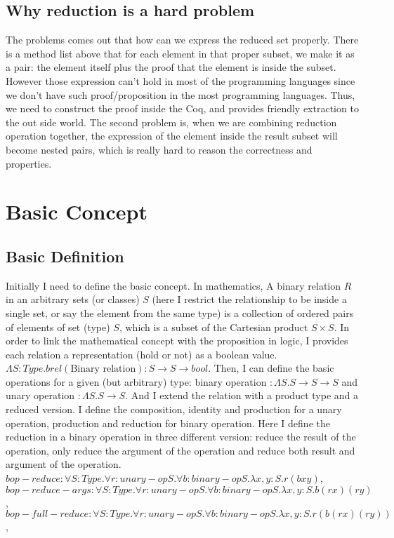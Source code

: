 \documentclass[11pt]{article}
\begin{document}
\subsection{Why reduction is a hard problem}
The problems comes out that how can we express the reduced set properly. There is a method list above that for each element in that proper subset, we make it as a pair: the element itself plus the proof that the element is inside the subset. However those expression can't hold in most of the programming languages since we don't have such proof/proposition in the most programming languages. Thus, we need to construct the proof inside the Coq, and provides friendly extraction to the out side world. The second problem is, when we are combining reduction operation together, the expression of the element inside the result subset will become nested pairs, which is really hard to reason the correctness and properties.
\section{Basic Concept}
\subsection{Basic Definition}
Initially I need to define the basic concept. 
In mathematics, A binary relation $R$ in an arbitrary sets (or classes) $S$ (here I restrict the relationship to be inside a single set, or say the element from the same type) is a collection of ordered pairs of elements of set (type) $S$, which is a subset of the Cartesian product $S \times S$. In order to link the mathematical concept with the proposition in logic, I provides each relation a representation (hold or not) as a boolean value. $\Lambda S: Type. brel(\text{Binary relation}) : S \rightarrow S \rightarrow bool$. 
Then, I can define the basic operations for a given (but arbitrary) type: binary operation $: \Lambda S.S \rightarrow S \rightarrow S$ and unary operation $: \Lambda S.S \rightarrow S$. 
And I extend the relation with a product type and a reduced version. I define the composition, identity and production for a unary operation, production and reduction for binary operation. Here I define the reduction in a binary operation in three different version: reduce the result of the operation, only reduce the argument of the operation and reduce both result and argument of the operation. 
$bop-reduce : \forall S:Type. \forall r: unary-op S. \forall b: binary-op S.\lambda x,y:S. r(b x y)$, 
$bop-reduce-args : \forall S:Type. \forall r: unary-op S. \forall b: binary-op S.\lambda x,y:S. b (r x) (r y)$, 
$bop-full-reduce : \forall S:Type. \forall r: unary-op S. \forall b: binary-op S.\lambda x,y:S. r(b (r x) (r y))$, 
\end{document}
